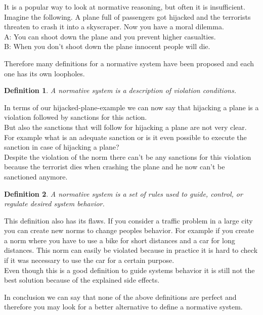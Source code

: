 \documentclass[conference]{hehe}
\newtheorem{definition}{Definition}
\begin{document}
It is a popular way to look at normative reasoning, but often it is insufficient. Imagine the following. A plane full of passengers got hijacked and the terrorists threaten to crash it into a skyscraper. Now you have a moral dilemma.\\
A: You can shoot down the plane and you prevent higher casualties.\\
B: When you don't shoot down the plane innocent people will die.

Therefore many definitions for a normative system have been proposed and each one has its own loopholes. \\


\begin{definition}
A normative system is a description
of violation conditions. \cite{b2}\\
\end{definition}

In terms of our hijacked-plane-example we can now say that hijacking a plane is a violation followed by sanctions for this action.\\
But also the sanctions that will follow for hijacking a plane are not very clear. For example what is an adequate sanction or is it even possible to execute the sanction in case of hijacking a plane?\\
Despite the violation of the norm there can't be any sanctions for this violation because the terrorist dies when crashing the plane and he now can't be sanctioned anymore.\\

\begin{definition}
A normative system is a set of rules used to guide,
control, or regulate desired system behavior.\cite{b2}\\
\end{definition}

This definition also has its flaws. If you consider a traffic problem in a large city you can create new norms to change peoples behavior. For example if you create a norm where you have to use a bike for short distances and a car for long distances. This norm can easily be violated because in practice it is hard to check if it was necessary to use the car for a certain purpose.\\
Even though this is a good definition to guide systems behavior it is still not the best solution because of the explained side effects.

In conclusion we can say that none of the above definitions are perfect and therefore you may look for a better alternative to define a normative system.
\end{document}
